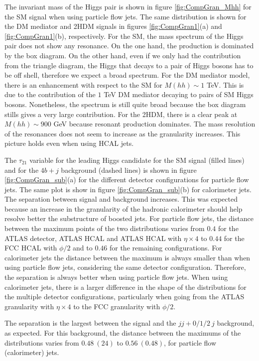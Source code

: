 The invariant mass of the Higgs pair is shown in figure \ref{fig:CompGran_Mhh} for the SM signal when using particle flow jets. The same distribution is shown for the DM mediator and 2HDM signals in figures \ref{fig:CompGran1}(a) and \ref{fig:CompGran1}(b), respectively. For the SM, the mass spectrum of the Higgs pair does not show any resonance. On the one hand, the production is dominated by the box diagram. On the other hand, even if we only had the contribution from the triangle diagram, the Higgs that decays to a pair of Higgs bosons has to be off shell, therefore we expect a broad spectrum. For the DM mediator model, there is an enhancement with respect to the SM for $M(hh)\sim 1$ TeV. This is due to the contribution of the $1$ TeV DM mediator decaying to pairs of SM Higgs bosons. Nonetheless, the spectrum is still quite broad because the box diagram stills gives a very large contribution. For the 2HDM, there is a clear peak at $M(hh)\sim 900$ GeV because resonant production dominates. The mass resolution of the resonances does not seem to increase as the granularity increases. This picture holds even when using HCAL jets.

The $\tau_{21}$ variable for the leading Higgs candidate for the SM signal (filled lines) and for the $4b+j$ background (dashed lines) is shown in figure \ref{fig:CompGran_sub}(a) for the different detector configurations for particle flow jets. The same plot is show in figure \ref{fig:CompGran_sub}(b) for calorimeter jets. The separation between signal and background increases. This was expected because an increase in the granularity of the hadronic calorimeter should help resolve better the substructure of boosted jets. For particle flow jets, the distance between the maximum points of the two distributions varies from $0.4$ for the ATLAS detector, ATLAS HCAL and ATLAS HCAL with $\eta\times 4$ to $0.44$ for the FCC HCAL with $\phi/2$ and to $0.46$ for the remaining configurations. For calorimeter jets the distance between the maximum is always smaller than when using particle flow jets, considering the same detector configuration. Therefore, the separation is always better when using particle flow jets. When using calorimeter jets, there is a larger difference in the shape of the distributions for the multiple detector configurations, particularly when going from the ATLAS granularity with $\eta\times 4$ to the FCC granularity with $\phi/2$. 

The separation is the largest between the signal and the $jj+0/1/2~j$ background, as expected. For this background, the distance between the maximums of the distributions varies from $0.48~(24)$ to $0.56 ~(0.48)$, for particle flow (calorimeter) jets.

